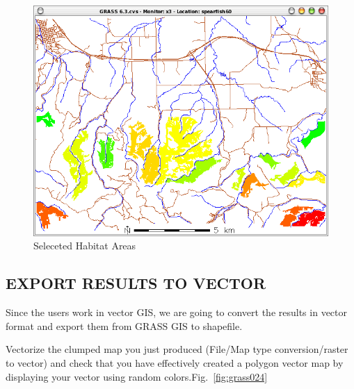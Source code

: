 \begin{figure}[htbp]
   \centering
   \includegraphics[scale=0.35]{grass023.png}
   \caption{Seleceted Habitat Areas}
   \label{fig:grass023}
\end{figure}

\subsection{EXPORT RESULTS TO VECTOR}
Since the users work in vector GIS, we are going to convert the results in vector format and export them from GRASS GIS to shapefile.

Vectorize the clumped map you just produced (File/Map type conversion/raster to vector) and check that you
have effectively created a polygon vector map by displaying your vector using random colors.Fig.~\ref{fig:grass024}

